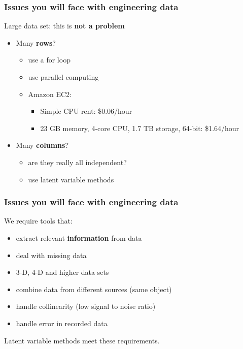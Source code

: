 \begin{frame}\frametitle{Issues you will face with engineering data}

	Large data set: this is \textbf{not a problem}
	\begin{block}
		{}
		\begin{center}
			{\color{myOrange}{It's not about the size of your data ... it's what you do with it.}}
		\end{center}
	\end{block}
	\begin{itemize}
		\item	Many \textbf{rows}?
		\begin{itemize}
			\item	use a for loop
			\item	use parallel computing
			\item	Amazon EC2:
			\begin{itemize}
				\item	Simple CPU rent: \$0.06/hour
				\item	23 GB memory, 4-core CPU, 1.7 TB storage, 64-bit: \$1.64/hour
			\end{itemize}
		\end{itemize}
	\end{itemize}
	\begin{itemize}
		\item	Many \textbf{columns}?
		\begin{itemize}
			\item	are they really all independent?
			\item	use latent variable methods
		\end{itemize}
	\end{itemize}
\end{frame}

\begin{frame}\frametitle{Issues you will face with engineering data}

	We require tools that:
	\begin{itemize}
		\item	extract relevant \textbf{information} from data
		\item	deal with missing data
		\item	3-D, 4-D and higher data sets
		\item	combine data from different sources (same object)
		\item	handle collinearity (low signal to noise ratio)
		\item	handle error in recorded data
	\end{itemize}

	Latent variable methods meet these requirements.
\end{frame}

